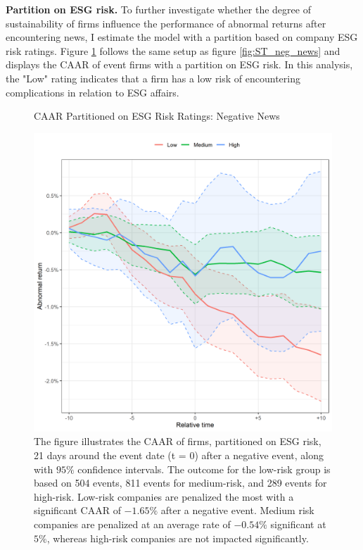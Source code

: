 \noindent \textbf{Partition on ESG risk.} To further investigate whether the degree of sustainability of firms influence the performance of abnormal returns  after encountering news, I estimate the model with a partition based on company ESG risk ratings. Figure \ref{fig:ST_neg_ESG} follows the same setup as figure \ref{fig:ST_neg_news} and displays the CAAR of event firms with a partition on ESG risk. In this analysis, the "Low" rating indicates that a firm has a low risk of encountering complications in relation to ESG affairs.

\begin{figure} [h]
    \centering
    \caption{CAAR Partitioned on ESG Risk Ratings: Negative News }
    \includegraphics[scale=0.6]{Projekt/1.Figures analysis/ST_negative_ESG.png}
     \caption*{\footnotesize The figure illustrates the CAAR of firms, partitioned on ESG risk, 21 days around the event date (t = 0) after a negative event, along with $95\%$ confidence intervals. The outcome for the low-risk group is based on 504 events, 811 events for medium-risk, and 289 events for high-risk. Low-risk companies are penalized the most with a significant CAAR of $-1.65\%$ after a negative event. Medium risk companies are penalized at an average rate of $-0.54\%$ significant at $5\%$, whereas high-risk companies are not impacted significantly.     
     }
    \label{fig:ST_neg_ESG}
\end{figure} 

